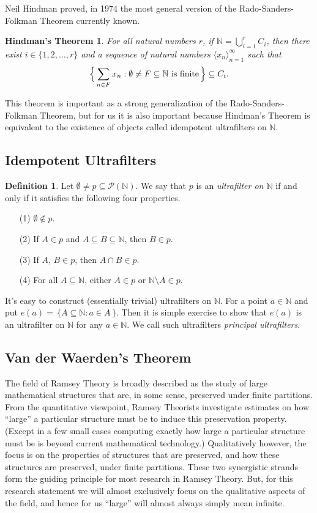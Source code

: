 \documentclass[12pt]{article}
\theoremstyle{plain}
\newtheorem{fst}[thm]{Hindman's Theorem}
\theoremstyle{definition}
\newtheorem{defn}[thm]{Definition}
\newcommand{\bbN}{\mathbb{N}}
\newcommand{\la}{\langle}
\newcommand{\ra}{\rangle}
\begin{document}
Neil Hindman proved, in 1974 \cite{Hindman:1974ys} the most general
version of the Rado-Sanders-Folkman Theorem currently known.
  \begin{fst}
    For all natural numbers $r$, if $\bbN = \bigcup_{i=1}^r C_i$, then
    there exist $i \in \{1, 2, \ldots, r\}$ and a sequence of natural
    numbers $\la x_n \ra_{n=1}^\infty$ such that
      \[
        \Bigl\{\,\sum_{n \in F} x_n : \emptyset \ne F \subseteq \bbN \hbox{
          is finite} \,\Bigr\} \subseteq C_i.
      \]
  \end{fst}
This theorem is important as a strong generalization of
the Rado-Sanders-Folkman Theorem, but for us it is also important because
Hindman's Theorem is equivalent to the existence of objects called
idempotent ultrafilters on $\bbN$.

\subsection{Idempotent Ultrafilters}
  \begin{defn}
    Let $\emptyset \ne p \subseteq \mathcal{P}(\bbN)$.
    We say that $p$ is an \textsl{ultrafilter on $\bbN$} if and only
    if it satisfies the following four properties.
      \begin{itemize}
        \item[(1)] $\emptyset \not\in p$.
        \item[(2)] If $A \in p$ and $A \subseteq B \subseteq \bbN$,
          then $B \in p$.
        \item[(3)] If $A$, $B \in p$, then $A \cap B \in p$.
        \item[(4)] For all $A \subseteq \bbN$, either $A \in p$ or
          $\bbN \setminus A \in p$.
      \end{itemize}
  \end{defn}

It's easy to construct (essentially trivial) ultrafilters on $\bbN$.
For a point $a \in \bbN$ and put $e(a) = \,\{ A \subseteq \bbN : a \in A
\,\}$.
Then it is simple exercise to show that $e(a)$ is an ultrafilter on
$\bbN$ for any $a \in \bbN$.
We call such ultrafilters \textsl{principal ultrafilters}. 

\subsection{Van der Waerden's Theorem}
The field of Ramsey Theory is broadly described as the study of large
mathematical structures that are, in some sense, preserved under
finite partitions.
From the quantitative viewpoint, Ramsey Theorists investigate
estimates on how ``large'' a particular structure must be to induce
this preservation property.
(Except in a few small cases computing exactly how large a particular
structure must be is beyond current mathematical technology.)
Qualitatively however, the focus is on the properties of structures that are preserved, and how these structures are preserved, under finite partitions.
These two synergistic strands form the guiding principle for most
research in Ramsey Theory.
But, for this research statement we will almost exclusively focus on
the qualitative aspects of the field, and hence for us ``large'' will
almost always simply mean infinite.
\end{document}

